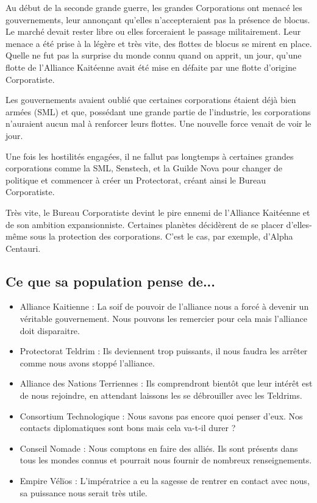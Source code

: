 \begin{multicols}{2}
Au début de la seconde grande guerre, les grandes Corporations ont menacé les gouvernements, leur annonçant qu'elles n'accepteraient pas la présence de blocus. Le marché devait rester libre ou elles forceraient le passage militairement. Leur menace a été prise à la légère et très vite, des flottes de blocus se mirent en place. Quelle ne fut pas la surprise du monde connu quand on apprit, un jour, qu'une flotte de l'Alliance Kaitéenne avait été mise en défaite par une flotte d'origine Corporatiste.

Les gouvernements avaient oublié que certaines corporations étaient déjà bien armées (SML) et que, possédant une grande partie de l'industrie, les corporations n'auraient aucun mal à renforcer leurs flottes. Une nouvelle force venait de voir le jour.

Une fois les hostilités engagées, il ne fallut pas longtemps à certaines grandes corporations comme la SML, Senstech, et la Guilde Nova pour changer de politique et commencer à créer un Protectorat, créant ainsi le Bureau Corporatiste.

Très vite, le Bureau Corporatiste devint le pire ennemi de l'Alliance Kaitéenne et de son ambition expansionniste. Certaines planètes décidèrent de se placer d'elles-même sous la protection des corporations. C'est le cas, par exemple, d'Alpha Centauri.

\subsection{Ce que sa population pense de...}

\begin{itemize}
\item Alliance Kaitienne : La soif de pouvoir de l'alliance nous a forcé à devenir un véritable gouvernement. Nous pouvons les remercier pour cela mais l'alliance doit disparaitre.
\item Protectorat Teldrim : Ils deviennent trop puissants, il nous faudra les arrêter comme nous avons stoppé l'alliance. 
\item Alliance des Nations Terriennes : Ils comprendront bientôt que leur intérêt est de nous rejoindre, en attendant laissons les se débrouiller avec les Teldrims.
\item Consortium Technologique : Nous savons pas encore quoi penser d'eux. Nos contacts diplomatiques sont bons mais cela va-t-il durer ?
\item Conseil Nomade : Nous comptons en faire des alliés. Ils sont présents dans tous les mondes connus et pourrait nous fournir de nombreux renseignements.
\item Empire Vélïos : L'impératrice a eu la sagesse de rentrer en contact avec nous, sa puissance nous serait très utile.
\end{itemize}


\end{multicols}

